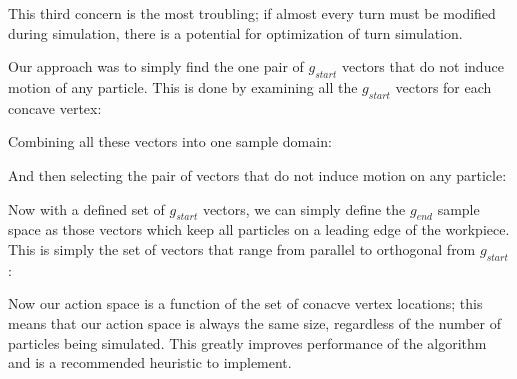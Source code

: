 This third concern is the most troubling; if almost every turn must be modified during simulation, there is a potential for optimization of turn simulation.

Our approach was to simply find the one pair of $g_{start}$ vectors that do not induce motion of any particle. This is done by examining all the $g_{start}$ vectors for each concave vertex:


Combining all these vectors into one sample domain:


And then selecting the pair of vectors that do not induce motion on any particle:


Now with a defined set of $g_{start}$ vectors, we can simply define the $g_{end}$ sample space as those vectors which keep all particles on a leading edge of the workpiece. This is simply the set of vectors that range from parallel to orthogonal from $g_{start}$:


Now our action space is a function of the set of conacve vertex locations; this means that our action space is always the same size, regardless of the number of particles being simulated. This greatly improves performance of the algorithm and is a recommended heuristic to implement.

